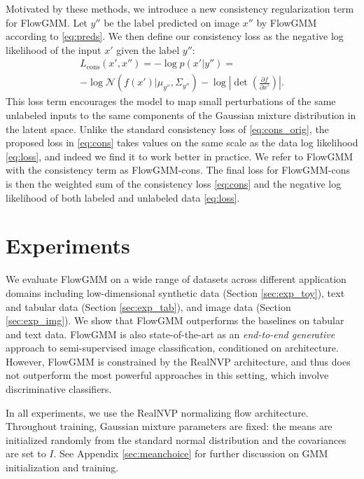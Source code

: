 \documentclass{article}
\newcommand{\method}{FlowGMM\xspace}
\newcommand{\methodcons}{FlowGMM-cons\xspace}
\newcommand{\mN}{\mathcal{N}}
\begin{document}
Motivated by these methods, we introduce a new consistency regularization term for \method.
Let $y''$ be the label predicted on image $x''$ by \method according to \eqref{eq:preds}.
We then define our consistency loss as the negative log likelihood of the input $x'$ given the label $y''$:
\begin{multline}
    \label{eq:cons}
    L_\text{cons}(x', x'') = -\log p(x'|y'') = \\ 
    -\log \mN(f(x') \vert \mu_{y''}, \Sigma_{y''}) 
    -  \log \left| \det \left( \frac{\partial f}{\partial x'} \right) \right|.
\end{multline}
This loss term encourages the
model to map small perturbations of the same unlabeled inputs to the same 
components of the Gaussian mixture distribution in the latent space.
Unlike the standard consistency loss of \eqref{eq:cons_orig}, the proposed loss in \eqref{eq:cons} takes values on the same scale as the data log likelihood \eqref{eq:loss}, and indeed we find it to work better in practice.
We refer to \method with the consistency term as \methodcons.
The final loss for \methodcons is then the weighted sum of the consistency loss \eqref{eq:cons} and the negative log likelihood of both labeled and unlabeled data \eqref{eq:loss}.

\section{Experiments}
\label{sec:exps}

We evaluate \method on a wide range of datasets across different application domains including low-dimensional synthetic data (Section \ref{sec:exp_toy}), text and tabular data (Section \ref{sec:exp_tab}), and image data (Section \ref{sec:exp_img}). 
We show that \method outperforms the baselines on tabular and text data. \method is also state-of-the-art as an \emph{end-to-end generative} approach to semi-supervised image classification, conditioned on architecture. However, \method is constrained by the RealNVP architecture, and thus does not outperform the most powerful approaches in this setting, which involve discriminative classifiers.

In all experiments, we use the RealNVP normalizing flow architecture. Throughout training, Gaussian mixture parameters are fixed:
the means are initialized randomly from the standard normal distribution and the covariances are set to $I$. See Appendix \ref{sec:meanchoice} for further discussion on GMM initialization and training.
\end{document}
